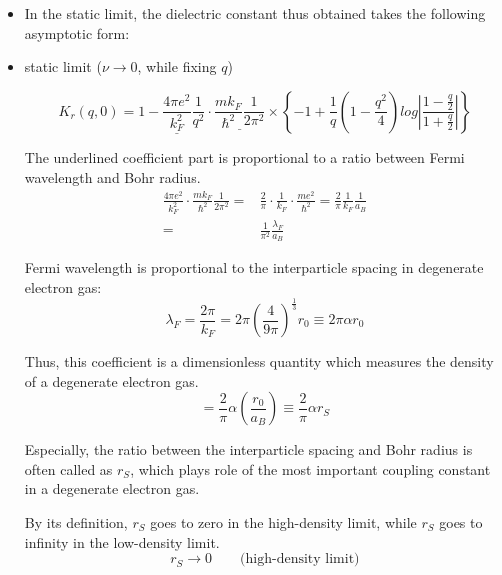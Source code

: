\begin{itemize}
\item In the static limit, the dielectric constant thus obtained takes the following asymptotic form:
\item \begin{center}static limit ($\nu \rightarrow 0$, while fixing $q$)\end{center}

\begin{equation} \label{Eqs2.8.29}
K_r(q,0) = 1-\underline{\frac{4\pi e^2}{k_F^2}} \frac{1}{q^2} \cdot \underline{\frac{m k_F}{\hbar^2} \frac{1}{2\pi^2}} \times \left\{ -1 + \frac{1}{q}\left( 1-\frac{q^2}{4} \right)log\left| \frac{1-\frac{q}{2}}{1+\frac{q}{2}} \right| \right\}
\end{equation}

The underlined coefficient part is proportional to a ratio between Fermi wavelength and Bohr radius.
\begin{equation} \label{Eqs2.8.30} \begin{split}
\frac{4\pi e^2}{k_F^2}\cdot\frac{m k_F}{\hbar^2} \frac{1}{2\pi^2} =& \frac{2}{\pi}\cdot\frac{1}{k_F}\cdot\frac{m e^2}{\hbar^2} = \frac{2}{\pi} \frac{1}{k_F}\frac{1}{a_B}\\
=& \frac{1}{\pi^2}\frac{\lambda_F}{a_B}
\end{split}\end{equation}

Fermi wavelength is proportional to the interparticle spacing in degenerate electron gas:
\begin{equation} \label{Eqs2.8.31}
\lambda_F = \frac{2\pi}{k_F} = 2\pi \left( \frac{4}{9\pi} \right)^{\frac{1}{3}} r_0 \equiv 2\pi \alpha r_0
\end{equation}

Thus, this coefficient is a dimensionless quantity which measures the density of a degenerate electron gas.
\begin{equation} \label{Eqs2.8.32}
=\frac{2}{\pi} \alpha (\frac{r_0}{a_B}) \equiv \frac{2}{\pi} \alpha r_S
\end{equation}

Especially, the ratio between the interparticle spacing and Bohr radius is often called as $r_S$, which plays role of the most important coupling constant in a degenerate electron gas.

By its definition, $r_S$ goes to zero in the high-density limit, while $r_S$ goes to infinity in the low-density limit.
\[ r_S \rightarrow 0 \qquad\text{(high-density limit)} \]


\end{itemize}
